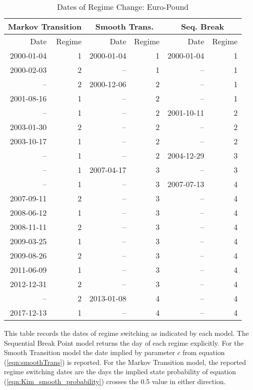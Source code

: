 \documentclass[12pt]{article}
\begin{document}
\begin{table}
	\centering
	\caption{Dates of Regime Change: Euro-Pound}
	\begin{tabular}[c]{r r | r r | r r}
		\midrule
		\multicolumn{2}{c}{Markov Transition} & \multicolumn{2}{c}{Smooth Trans.} & \multicolumn{2}{c}{Seq. Break} \\
		\midrule
		Date & Regime & Date & Regime & Date & Regime \\
		\midrule
		2000-01-04 &  1 & 2000-01-04 &  1 & 2000-01-04 &  1 \\
		2000-02-03 &  2 &         -- &  1 &         -- &  1 \\
		        -- &  2 & 2000-12-06 &  2 &         -- &  1 \\
		2001-08-16 &  1 &         -- &  2 &         -- &  1 \\
		        -- &  1 &         -- &  2 & 2001-10-11 &  2 \\
		2003-01-30 &  2 &         -- &  2 &         -- &  2 \\
		2003-10-17 &  1 &         -- &  2 &         -- &  2 \\
		        -- &  1 &         -- &  2 & 2004-12-29 &  3 \\
				-- &  1 & 2007-04-17 &  3 &         -- &  3 \\
		        -- &  1 &         -- &  3 & 2007-07-13 &  4 \\				
		2007-09-11 &  2 &         -- &  3 &         -- &  4 \\
		2008-06-12 &  1 &         -- &  3 &         -- &  4 \\
		2008-11-11 &  2 &         -- &  3 &         -- &  4 \\
		2009-03-25 &  1 &         -- &  3 &         -- &  4 \\
		2009-08-26 &  2 &         -- &  3 &         -- &  4 \\
		2011-06-09 &  1 &         -- &  3 &         -- &  4 \\
		2012-12-31 &  2 &         -- &  3 &         -- &  4 \\
		        -- &  2 & 2013-01-08 &  4 &         -- &  4 \\
		2017-12-13 &  1 &         -- &  4 &         -- &  4 \\
		\hline
	\end{tabular}
	\begin{tablenotes}
		\item{\footnotesize This table records the dates of regime switching as indicated by each model. The Sequential Break Point model returns the day of each regime explicitly. For the Smooth Transition model the date implied by parameter $c$ from equation (\ref{eqn:smoothTrans}) is reported. For the Markov Transition model, the reported regime switching dates are the days the implied state probability of equation (\ref{eqn:Kim_smooth_probability}) crosses the 0.5 value in either direction.}
	\end{tablenotes}
	\label{tbl:regime_changes_euro_pound}
\end{table}
\end{document}

